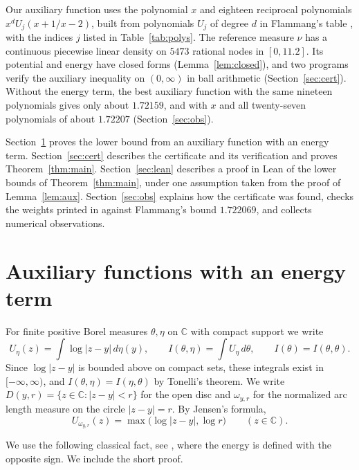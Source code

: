 \documentclass[11pt]{amsart}
\theoremstyle{remark}
\numberwithin{equation}{section}
\newcommand{\C}{\mathbb{C}}
\newcommand{\NNodes}{5473}
\newcommand{\SuppHi}{11.2}
\newcommand{\NoEnergyOmega}{1.72159}
\newcommand{\FlamVal}{1.722069}
\begin{document}
Our auxiliary function uses the polynomial $x$ and eighteen reciprocal polynomials $x^dU_j(x+1/x-2)$, built from polynomials $U_j$ of degree $d$ in Flammang's table \cite[Table~1]{Fla15}, with the indices $j$ listed in Table~\ref{tab:polys}. The reference measure $\nu$ has a continuous piecewise linear density on $\NNodes$ rational nodes in $[0,\SuppHi]$. Its potential and energy have closed forms (Lemma~\ref{lem:closed}), and two programs verify the auxiliary inequality on $(0,\infty)$ in ball arithmetic \cite{Joh17} (Section~\ref{sec:cert}). Without the energy term, the best auxiliary function with the same nineteen polynomials gives only about $\NoEnergyOmega$, and with $x$ and all twenty-seven polynomials of \cite[Table~1]{Fla15} about $1.72207$ (Section~\ref{sec:obs}).

Section~\ref{sec:aux} proves the lower bound from an auxiliary function with an energy term. Section~\ref{sec:cert} describes the certificate and its verification and proves Theorem~\ref{thm:main}. Section~\ref{sec:lean} describes a proof in Lean of the lower bounds of Theorem~\ref{thm:main}, under one assumption taken from the proof of Lemma~\ref{lem:aux}. Section~\ref{sec:obs} explains how the certificate was found, checks the weights printed in \cite[Table~1]{Fla15} against Flammang's bound $\FlamVal$, and collects numerical observations.

\section{Auxiliary functions with an energy term}\label{sec:aux}

For finite positive Borel measures $\theta,\eta$ on $\C$ with compact support we write
\[
U_\eta(z)=\int\log|z-y|\,d\eta(y),\qquad I(\theta,\eta)=\int U_\eta\,d\theta,\qquad I(\theta)=I(\theta,\theta).
\]
Since $\log|z-y|$ is bounded above on compact sets, these integrals exist in $[-\infty,\infty)$, and $I(\theta,\eta)=I(\eta,\theta)$ by Tonelli's theorem. We write $D(y,r)=\{z\in\C:|z-y|<r\}$ for the open disc and $\omega_{y,r}$ for the normalized arc length measure on the circle $|z-y|=r$. By Jensen's formula,
\begin{equation}\label{eq:circle}
U_{\omega_{y,r}}(z)=\max\bigl(\log|z-y|,\log r\bigr)\qquad(z\in\C).
\end{equation}

We use the following classical fact, see \cite[Lemma~I.1.8]{ST97}, where the energy is defined with the opposite sign. We include the short proof.
\end{document}

